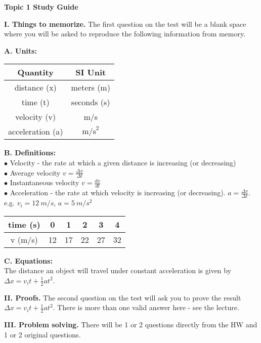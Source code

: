 \documentclass[11pt]{article}
\begin{document}
{\centering
\textbf{Topic 1 Study Guide} \par
\vspace{\baselineskip}
}

\textbf{I. Things to memorize.}
The first question on the test will be a blank space where you will be asked to reproduce the following information from memory.
\vspace{0.5\baselineskip}

\begin{addmargin}[1em]{0em}%
\textbf{A. Units:}

\vspace{0.25\baselineskip}
\begin{tabular}{ |c|c| } 
\hline
Quantity & SI Unit \\ 
\hline
distance (x) & meters (m) \\ 
\hline
time (t) & seconds (s) \\ 
\hline
velocity (v) & m/s \\ 
\hline
acceleration (a) & $\text{m/s}^2$ \\ 
\hline
\end{tabular}
\vspace{0.75\baselineskip}

\textbf{B. Definitions:} \\
$\bullet$ Velocity - the rate at which a given distance is increasing (or decreasing) \\
\null\quad $\bullet$ Average velocity $v = \frac{\Delta x}{\Delta t}$ \\
\null\quad $\bullet$ Instantaneous velocity $v = \frac{d x}{d t}$ \\
$\bullet$ Acceleration - the rate at which velocity is increasing (or decreasing). $a = \frac{\Delta v}{\Delta t}$. \\
e.g. $v_i = 12 \ m/s$, $a = 5 \ m/s^2$

\vspace{0.25\baselineskip}
\begin{tabular}{ |c|c|c|c|c|c| } 
\hline
time (s) & 0 & 1 & 2 & 3 & 4 \\ 
\hline
v (m/s) & 12 & 17 & 22 & 27 & 32 \\ 
\hline
\end{tabular}
\vspace{0.75\baselineskip}

\textbf{C. Equations:} \\
The distance an object will travel under constant acceleration is given by $\Delta x = v_i t + \frac{1}{2} a t^2$.
\end{addmargin}

\vspace{\baselineskip}
\textbf{II. Proofs.}
The second question on the test will ask you to prove the result $\Delta x = v_i t + \frac{1}{2} a t^2$.
There is more than one valid answer here - see the lecture.

\vspace{\baselineskip}
\textbf{III. Problem solving.}
There will be 1 or 2 questions directly from the HW and 1 or 2 original questions.
\end{document}

